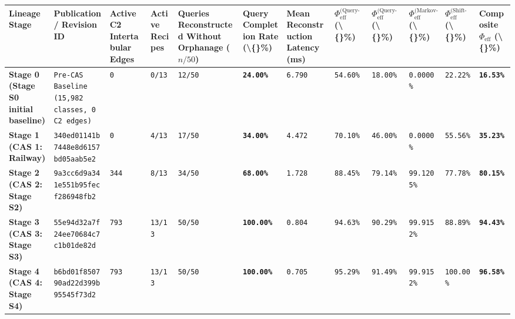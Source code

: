 \documentclass[10pt,a4paper]{article}
\begin{document}
{\scriptsize
\begin{longtable}{p{}p{}p{}p{}p{}p{}p{}p{}p{}p{}p{}p{}}
\toprule
\textbf{Lineage Stage} & \textbf{Publication / Revision ID} & \textbf{Active C2 Intertabular Edges} & \textbf{Active Recipes} & \textbf{Queries Reconstructed Without Orphanage ($n/50$)} & \textbf{Query Completion Rate (\textbackslash\{\}\%)} & \textbf{Mean Reconstruction Latency (ms)} & \textbf{$\Phi_{\text{eff}}^{\text{(Query-Time vs M1)}}$ (\textbackslash\{\}\%)} & \textbf{$\Phi_{\text{eff}}^{\text{(Query-Time vs M2)}}$ (\textbackslash\{\}\%)} & \textbf{$\Phi_{\text{eff}}^{\text{(Markov-Isolation)}}$ (\textbackslash\{\}\%)} & \textbf{$\Phi_{\text{eff}}^{\text{(Shift-Left-Kits)}}$ (\textbackslash\{\}\%)} & \textbf{Composite $\Phi_{\text{eff}}$ (\textbackslash\{\}\%)} \\
\midrule
\endhead
\textbf{Stage 0 (Stage S0 initial baseline)} & \texttt{Pre-CAS Baseline (15,982 classes, 0 C2 edges)} & \texttt{0} & \texttt{0/13} & \texttt{12/50} & \textbf{\texttt{24.00\%}} & \texttt{6.790} & \texttt{54.60\%} & \texttt{18.00\%} & \texttt{0.0000\%} & \texttt{22.22\%} & \textbf{\texttt{16.53\%}} \\
\textbf{Stage 1 (CAS 1: Railway)} & \texttt{340ed01141b7448e8d6157bd05aab5e2} & \texttt{0} & \texttt{4/13} & \texttt{17/50} & \textbf{\texttt{34.00\%}} & \texttt{4.472} & \texttt{70.10\%} & \texttt{46.00\%} & \texttt{0.0000\%} & \texttt{55.56\%} & \textbf{\texttt{35.23\%}} \\
\textbf{Stage 2 (CAS 2: Stage S2)} & \texttt{9a3cc6d9a341e551b95fecf286948fb2} & \texttt{344} & \texttt{8/13} & \texttt{34/50} & \textbf{\texttt{68.00\%}} & \texttt{1.728} & \texttt{88.45\%} & \texttt{79.14\%} & \texttt{99.1205\%} & \texttt{77.78\%} & \textbf{\texttt{80.15\%}} \\
\textbf{Stage 3 (CAS 3: Stage S3)} & \texttt{55e94d32a7f24ee70684c7c1b01de82d} & \texttt{793} & \texttt{13/13} & \texttt{50/50} & \textbf{\texttt{100.00\%}} & \texttt{0.804} & \texttt{94.63\%} & \texttt{90.29\%} & \texttt{99.9152\%} & \texttt{88.89\%} & \textbf{\texttt{94.43\%}} \\
\textbf{Stage 4 (CAS 4: Stage S4)} & \texttt{b6bd01f850790ad22d399b95545f73d2} & \texttt{793} & \texttt{13/13} & \texttt{50/50} & \textbf{\texttt{100.00\%}} & \texttt{0.705} & \texttt{95.29\%} & \texttt{91.49\%} & \texttt{99.9152\%} & \texttt{100.00\%} & \textbf{\texttt{96.58\%}} \\
\bottomrule
\end{longtable}
}
\end{document}
